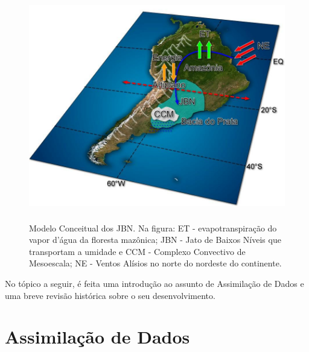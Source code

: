 \begin{figure}

\includegraphics[height=10cm]{./figs/fig10.png}
\caption{Modelo Conceitual dos JBN. Na figura: ET - evapotranspiração do vapor d'água da floresta mazônica; JBN - Jato de Baixos Níveis que transportam a umidade e CCM - Complexo Convectivo de Mesoescala; NE - Ventos Alísios no norte do nordeste do continente.}
\label{fig10}
\end{figure}

No tópico a seguir, é feita uma introdução ao assunto de Assimilação de Dados e uma breve revisão histórica sobre o seu desenvolvimento.

\section{Assimilação de Dados}
\label{ss:assimdados}


